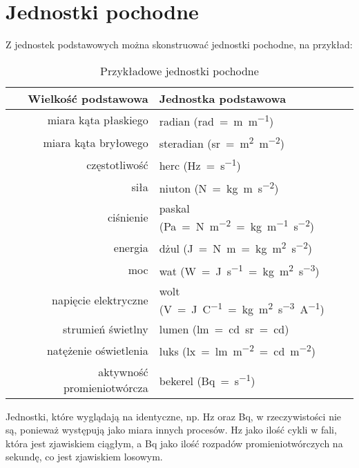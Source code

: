 \documentclass{article}
\begin{document}
\section{Jednostki pochodne}
Z jednostek podstawowych można skonstruować jednostki pochodne, na przykład:
\begin{table}[H]
\centering
\begin{tabular}{rl}
\toprule
Wielkość podstawowa & Jednostka podstawowa \\
\midrule
miara kąta płaskiego & radian (\unit{\radian=\m\per\m}) \\
miara kąta bryłowego & steradian (\unit{\steradian=\m\squared\per\m\squared}) \\
częstotliwość & herc (\unit{\Hz=\s^{-1}}) \\
siła & niuton (\unit{\newton=\kg.\m.\s^{-2}}) \\
ciśnienie & paskal (\unit{\pascal=\newton\per\metre\squared=\kg.\m^{-1}.\s^{-2}}) \\
energia & dżul (\unit{\J=\newton.\m=\kg.\m^{2}.\s^{-2}}) \\
moc & wat (\unit{\watt=\joule\per\s=\kg.\m^{2}.\s^{-3}}) \\
napięcie elektryczne & wolt (\unit{\volt=\joule\per\coulomb=\kg.\m^{2}.\s^{-3}.\A^{-1}}) \\
strumień świetlny & lumen (\unit{\lumen=\candela.\steradian=\candela}) \\
natężenie oświetlenia & luks (\unit{\lux=\lumen\per\m\squared=\candela.\m^{-2}}) \\
aktywność promieniotwórcza & bekerel (\unit{\becquerel=\s^{-1}}) \\
\bottomrule
\end{tabular}
\caption{Przykładowe jednostki pochodne}
\end{table}
Jednostki, które wyglądają na identyczne, np. \unit{\hertz} oraz \unit{\becquerel}, w rzeczywistości nie są, ponieważ występują jako miara innych procesów. \unit{\hertz} jako ilość cykli w fali, która jest zjawiskiem ciągłym, a \unit{\becquerel} jako ilość rozpadów promieniotwórczych na sekundę, co jest zjawiskiem losowym.
\end{document}
